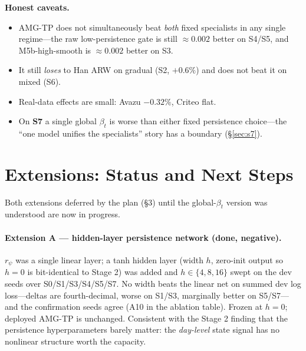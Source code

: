 \documentclass[11pt]{article}
\begin{document}
\noindent\textbf{Honest caveats.}
\begin{itemize}[nosep]
\item AMG-TP does not simultaneously beat \emph{both} fixed specialists in any
single regime---the raw low-persistence gate is still $\approx0.002$ better on
S4/S5, and M5b-high-smooth is $\approx0.002$ better on S3.
\item It still \emph{loses} to Han ARW on gradual (S2, $+0.6\%$) and does not
beat it on mixed (S6).
\item Real-data effects are small: Avazu $-0.32\%$, Criteo flat.
\item On \textbf{S7} a single global $\beta_t$ is worse than either fixed
persistence choice---the ``one model unifies the specialists'' story has a
boundary (\S\ref{sec:s7}).
\end{itemize}

\section{Extensions: Status and Next Steps}

Both extensions deferred by the plan (\S3) until the global-$\beta_t$ version was
understood are now in progress.

\paragraph{Extension A --- hidden-layer persistence network (done, negative).}
$r_\psi$ was a single linear layer; a tanh hidden layer (width $h$, zero-init
output so $h{=}0$ is bit-identical to Stage 2) was added and $h\in\{4,8,16\}$
swept on the dev seeds over S0/S1/S3/S4/S5/S7. No width beats the linear net on
summed dev log loss---deltas are fourth-decimal, worse on S1/S3, marginally
better on S5/S7---and the confirmation seeds agree (A10 in the ablation table).
Frozen at $h{=}0$; deployed AMG-TP is unchanged. Consistent with the Stage 2
finding that the persistence hyperparameters barely matter: the \emph{day-level}
state signal has no nonlinear structure worth the capacity.
\end{document}
